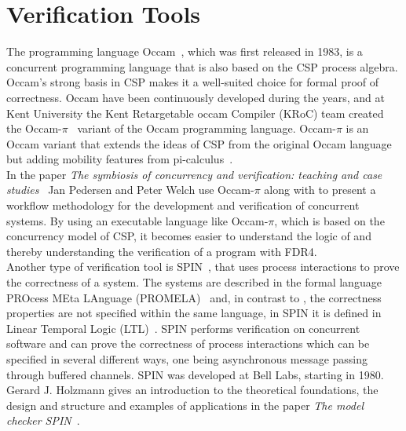 \section{Verification Tools}
The programming language Occam~\cite{Occam1995}, which was first released in 1983, is a concurrent programming language that is also based on the CSP process algebra. Occam's strong basis in CSP makes it a well-suited choice for formal proof of correctness.
Occam have been continuously developed during the years, and at Kent University the Kent Retargetable occam Compiler (KRoC) team created the Occam-$\pi$~\cite{UniveristyofKent} variant of the Occam programming language.
Occam-$\pi$ is an Occam variant that extends the ideas of CSP from the original Occam language but adding mobility features from pi-calculus~\cite{Milner1992}.
\\

In the paper \textit{The symbiosis of concurrency and verification: teaching and case studies}~\cite{Pedersen2018} Jan Pedersen and Peter Welch use Occam-$\pi$ along with \cspm{} to present a workflow methodology for the development and verification of concurrent systems. By using an executable language like Occam-$\pi$, which is based on the concurrency model of CSP, it becomes easier to understand the logic of \cspm{} and thereby understanding the verification of a program with FDR4.\\

Another type of verification tool is SPIN~\cite{spin}, that uses process interactions to prove the correctness of a system. The systems are described in the formal language PROcess MEta LAnguage (PROMELA)~\cite{Holzmann1991} and, in contrast to \cspm{}, the correctness properties are not specified within the same language, in SPIN it is defined in Linear Temporal Logic (LTL)~\cite{Pnueli1977}.
SPIN performs verification on concurrent software and can prove the correctness of process interactions which can be specified in several different ways, one being asynchronous message passing through buffered channels.
SPIN was developed at Bell Labs, starting in 1980. Gerard J. Holzmann gives an introduction to the theoretical foundations, the design and structure and examples of applications in the paper \textit{The model checker SPIN}~\cite{Holzmann1997}.\\

